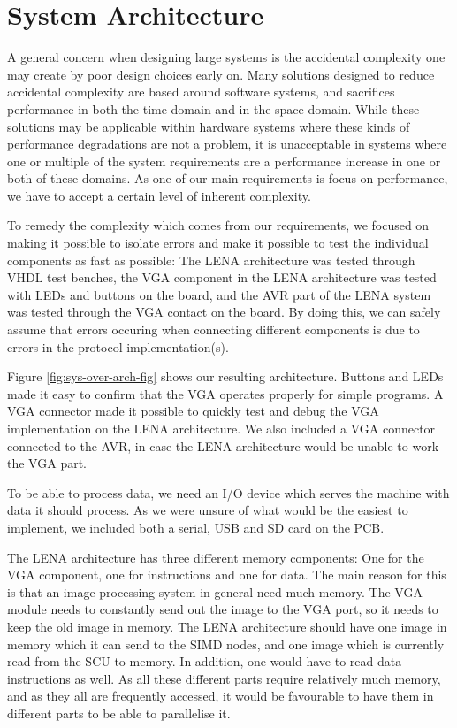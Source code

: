 \section{System Architecture}

A general concern when designing large systems is the accidental
complexity\cite[p.~8-9]{holt2004uml} one may create by poor design choices early
on. Many solutions designed to reduce accidental complexity are based around
software systems, and sacrifices performance in both the time domain and in the
space domain\cite{moseley2006out}. While these solutions may be applicable
within hardware systems where these kinds of performance degradations are not a
problem, it is unacceptable in systems where one or multiple of the system
requirements are a performance increase in one or both of these domains. As one
of our main requirements is focus on performance, we have to accept a certain
level of inherent complexity.



To remedy the complexity which comes from our requirements, we focused on making
it possible to isolate errors and make it possible to test the individual
components as fast as possible: The \ac{LENA} architecture was tested through
\ac{VHDL} test benches, the \ac{VGA} component in the \ac{LENA} architecture was
tested with \acp{LED} and buttons on the board, and the \ac{AVR} part of the
\ac{LENA} system was tested through the \ac{VGA} contact on the board. By doing
this, we can safely assume that errors occuring when connecting different
components is due to errors in the protocol implementation(s).

Figure \ref{fig:sys-over-arch-fig} shows our resulting architecture. Buttons and
\acp{LED} made it easy to confirm that the \ac{VGA} operates properly for simple
programs. A \ac{VGA} connector made it possible to quickly test and debug the
\ac{VGA} implementation on the \ac{LENA} architecture. We also included a
\ac{VGA} connector connected to the AVR, in case the \ac{LENA} architecture
would be unable to work the \ac{VGA} part.

To be able to process data, we need an \ac{I/O} device which serves the machine
with data it should process. As we were unsure of what would be the easiest to
implement, we included both a serial, \ac{USB} and \ac{SD} card on the \ac{PCB}.

The \ac{LENA} architecture has three different memory components: One for the
\ac{VGA} component, one for instructions and one for data. The main reason for
this is that an image processing system in general need much memory. The
\ac{VGA} module needs to constantly send out the image to the \ac{VGA} port, so
it needs to keep the old image in memory. The \ac{LENA} architecture should have
one image in memory which it can send to the \ac{SIMD} nodes, and one image
which is currently read from the \ac{SCU} to memory. In addition, one would have
to read data instructions as well. As all these different parts require
relatively much memory, and as they all are frequently accessed, it would be
favourable to have them in different parts to be able to parallelise it.
